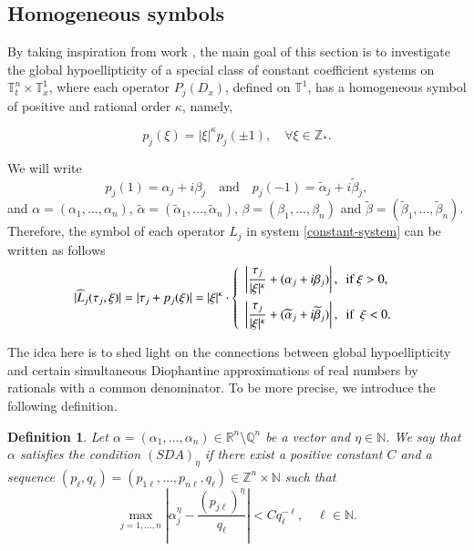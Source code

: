 \documentclass[12pt]{elsarticle}
\newtheorem{definition}[theorem]{Definition}
\numberwithin{equation}{section}
\begin{document}
\subsection{Homogeneous symbols \label{homo-symbols}}

By taking inspiration from work \cite{AGKM}, the main goal of this section is to investigate the global hypoellipticity of a special class of constant coefficient  systems on $\mathbb{T}^n_t \times \mathbb{T}_x^{1}$, where each  operator $P_j(D_x)$, defined on $\mathbb{T}^1$, has a homogeneous symbol of positive and rational order  $\kappa$, namely, 


$$
p_j(\xi)=|\xi|^{\kappa}p_j(\pm 1), \quad \forall \xi\in \mathbb{Z}_*.
$$

We will write
$$
p_j(1) = \alpha_j + i \beta_j \quad \textrm{and} \quad p_j(-1) = \widetilde{\alpha}_j + i \widetilde{\beta}_j,
$$ 
and $\alpha=(\alpha_{1},\ldots,\alpha_n)$, $\widetilde{\alpha}=(\widetilde{\alpha}_{1},\ldots,\widetilde{\alpha}_n)$, $\beta=(\beta_{1},\ldots,\beta_n)$ and $\widetilde{\beta}=(\widetilde{\beta}_{1},\ldots,\widetilde{\beta}_n)$. Therefore, the symbol of each operator $L_j$ in system \eqref{constant-system} can be written as follows 
\begin{equation}\label{eqq}
|\widehat{L}_j(\tau_j, \xi)| = |\tau_j+p_j(\xi)| = |\xi|^{\kappa} \cdot 
\left \{
\begin{array}{l}
\left| \dfrac{\tau_j}{|\xi|^{\kappa}} + (\alpha_j  + i \beta_j ) \right|,  \ \textrm{ if } \xi>0, \vspace{2mm} \\
\left| \dfrac{\tau_j}{|\xi|^{\kappa}} + (\widetilde{\alpha}_j   + i \widetilde{\beta}_j ) \right|, \ \textrm{ if } \ \xi<0.
\end{array}
\right.
\end{equation}

The idea here is to shed light on the  connections between global hypoellipticity and certain  simultaneous Diophantine approximations of real numbers by rationals with a common  denominator. To be more precise, we introduce the following definition.
\begin{definition}\label{def-SDA}	
	Let $\alpha=(\alpha_1,\ldots,\alpha_n)\in\mathbb{R}^n\setminus \mathbb{Q}^n$ be a vector and $\eta\in\mathbb{N}$. We say that $\alpha$ satisfies the condition $(SDA)_{\eta}$ if there exist a positive  constant $C$ and a sequence $(p_\ell,q_\ell)=(p_{1\ell},\ldots,p_{n\ell},q_\ell)\in\mathbb{Z}^n\times \mathbb{N}$ such that 
	\begin{equation}
	\max_{j=1,\dots,n}\left|\alpha_{j}^\eta-\dfrac{(p_{j\ell})^\eta}{q_\ell}\right|<  C q_{\ell}^{-\ell}, \quad \ell \in\mathbb{N}.
	\end{equation}
\end{definition}
\end{document}
